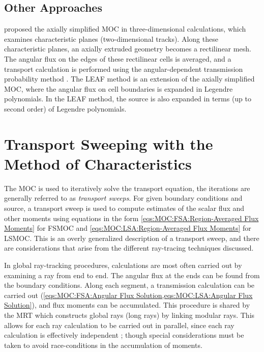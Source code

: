 {{        \subsection{Other Approaches}{\label{ssec:RT:Other Approaches}
            \citet{Giho2008} proposed the axially simplified \ac{MOC} in three-dimensional calculations, which examines characteristic planes (two-dimensional tracks).
            Along these characteristic planes, an axially extruded geometry becomes a rectilinear mesh.
            The angular flux on the edges of these rectilinear cells is averaged, and a transport calculation is performed using the angular-dependent transmission probability method \cite{Yamamoto2015}.
            The \ac{LEAF} method \cite{Yamamoto2017} is an extension of the axially simplified \ac{MOC}, where the angular flux on cell boundaries is expanded in Legendre polynomials.
            In the \ac{LEAF} method, the source is also expanded in terms (up to second order) of Legendre polynomials.
        }
    }
    \section{Transport Sweeping with the Method of Characteristics}{\label{sec:RT:Transport Sweeping with the Method of Characteristics}
        The \ac{MOC} is used to iteratively solve the transport equation, the iterations are generally referred to as \emph{transport sweeps}.
        For given boundary conditions and source, a transport sweep is used to compute estimates of the scalar flux and other moments using equations in the form \cref{eqs:MOC:FSA:Region-Averaged Flux Moments} for \ac{FSMOC} and \cref{eqs:MOC:LSA:Region-Averaged Flux Moments} for \ac{LSMOC}.
        This is an overly generalized description of a transport sweep, and there are considerations that arise from the different ray-tracing techniques discussed.

        In global ray-tracking procedures, calculations are most often carried out by examining a ray from end to end.
        The angular flux at the ends can be found from the boundary conditions.
        Along each segment, a transmission calculation can be carried out (\cref{eqs:MOC:FSA:Angular Flux Solution,eqs:MOC:LSA:Angular Flux Solution}), and flux moments can be accumulated.
        This procedure is shared by the \ac{MRT} which constructs global rays (long rays) by linking modular rays.
        This allows for each ray calculation to be carried out in parallel, since each ray calculation is effectively independent \cite{Kochunas2013}; though special considerations must be taken to avoid race-conditions in the accumulation of moments.

}}
